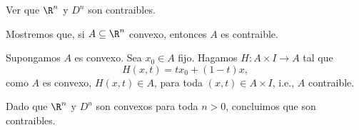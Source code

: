\begin{ejercicio}
        Ver que $\R^n$ y $D^n$ son contraibles.
    \end{ejercicio}

\begin{demostracion}
    Mostremos que, si $A\subseteq \R^n$ convexo, entonces $A$ es contraible.

    Supongamos $A$ es convexo. Sea $x_0\in A$ fijo. Hagamos $H:A\times I\to A$ tal que 
    \begin{equation*}
        H(x,t)=tx_0+(1-t)x,
    \end{equation*}
    como $A$ es convexo, $H(x,t)\in A$, para toda $(x,t)\in A\times I$, i.e., $A$ contraible.

    Dado que $\R^n$ y $D^n$ son convexos para toda $n>0$, concluimos que son contraibles.
\end{demostracion}
